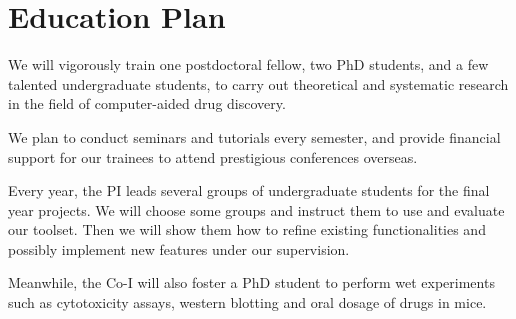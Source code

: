 \documentclass[a4paper,12pt]{article}
\begin{document}
\section*{Education Plan}

We will vigorously train one postdoctoral fellow, two PhD students, and a few talented undergraduate students, to carry out theoretical and systematic research in the field of computer-aided drug discovery.

We plan to conduct seminars and tutorials every semester, and provide financial support for our trainees to attend prestigious conferences overseas.

Every year, the PI leads several groups of undergraduate students for the final year projects. We will choose some groups and instruct them to use and evaluate our toolset. Then we will show them how to refine existing functionalities and possibly implement new features under our supervision.

Meanwhile, the Co-I will also foster a PhD student to perform wet experiments such as cytotoxicity assays, western blotting and oral dosage of drugs in mice.

\newpage
\linespread{0.5}
\footnotesize



\end{document}
